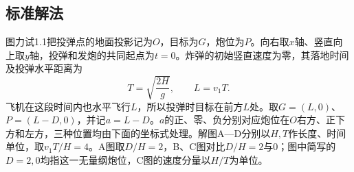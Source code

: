\documentclass[UTF8,fontset=fandol,a4paper,11pt]{ctexart}
\begin{document}


\subsection*{标准解法}


图力试1.1把投弹点的地面投影记为$O$，目标为$G$，炮位为$P$。向右取$x$轴、竖直向上取$y$轴，投弹和发炮的共同起点为$t=0$。炸弹的初始竖直速度为零，其落地时间及投弹水平距离为
\[
T=\sqrt{\frac{2H}{g}},\qquad L=v_1T.
\]
飞机在这段时间内也水平飞行$L$，所以投弹时目标在前方$L$处。取$G=(L,0)$、$P=(L-D,0)$，并记$a=L-D$。$a$的正、零、负分别对应炮位在$O$右方、正下方和左方，三种位置均由下面的坐标式处理。解图A—D分别以$H,T$作长度、时间单位，取$v_1T/H=4$。A图取$D/H=2$，B、C图对比$D/H=2$与0；图中简写的$D=2,0$均指这一无量纲炮位，C图的速度分量以$H/T$为单位。
\end{document}
